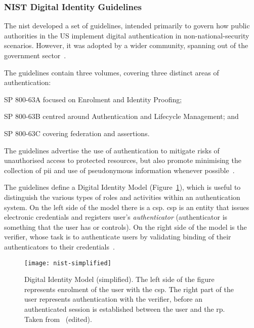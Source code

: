 \subsubsection{NIST Digital Identity Guidelines}

The \acrfull{nist} developed a set of guidelines, intended primarily to govern how public authorities in the US implement digital authentication in non-national-security scenarios. However, it was adopted by a wider community, spanning out of the government sector~\cite{Grassi2017GovernmentCollaboration}.

The guidelines contain three volumes, covering three distinct areas of authentication:
\begin{enumerate*}[label=(\roman*)]
    \item SP 800-63A focused on Enrolment and Identity Proofing;
    \item SP 800-63B centred around Authentication and Lifecycle Management; and
    \item SP 800-63C covering federation and assertions.
\end{enumerate*}
The guidelines advertise the use of authentication to mitigate risks of unauthorised access to protected resources, but also promote minimising the collection of \acrfull{pii} and use of pseudonymous information whenever possible~\cite{Grassi2017Digital3}.

The guidelines define a Digital Identity Model (Figure~\ref{fig:nist-model}), which is useful to distinguish the various types of roles and activities within an authentication system. On the left side of the model there is a \acrfull{csp}. \acrshort{csp} is an entity that issues electronic credentials and registers user's \textit{authenticator} (authenticator is something that the user has or controls). On the right side of the model is the verifier, whose task is to authenticate users by validating binding of their authenticators to their credentials~\cite{Grassi2017Digital3}.

 \begin{figure}[ht]
    \centering
    \texttt{[image: nist-simplified]}
    \caption{Digital Identity Model (simplified). The left side of the figure represents enrolment of the user with the \acrshort{csp}. The right part of the user represents authentication with the verifier, before an authenticated session is established between the user and the \acrshort{rp}. Taken from~\cite{Grassi2017Digital3} (edited).}
    \label{fig:nist-model}
\end{figure}

